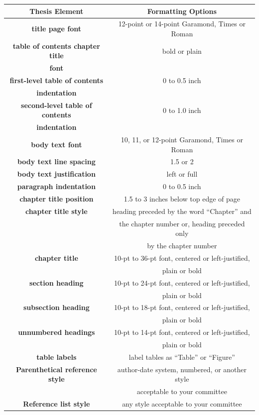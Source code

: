 \begin{table}[h]
	\begin{tabular*}{\textwidth}{|c|@{\extracolsep{\fill}}c|}
		\hline
		\textbf{Thesis Element} & \textbf{Formatting Options} \\ \hline
		\textbf{title page font} & \small 12-point or 14-point Garamond, Times or Roman \\ \hline
		\textbf{table of contents chapter title} & \small bold or plain \\
			\textbf{font} & \\ \hline
		\textbf{first-level table of contents} & \small 0 to 0.5 inch \\
			\textbf{indentation} & \\ \hline
		\textbf{second-level table of contents} & \small 0 to 1.0 inch \\
			\textbf{indentation} & \\ \hline
		\textbf{body text font} & \small 10, 11, or 12-point Garamond, Times or Roman \\ \hline
		\textbf{body text line spacing} & \small 1.5 or 2 \\ \hline
		\textbf{body text justification} & \small left or full \\ \hline
		\textbf{paragraph indentation} & \small 0 to 0.5 inch \\ \hline
		\textbf{chapter title position} & \small 1.5 to 3 inches below top edge of page \\ \hline
		\textbf{chapter title style} & \small heading preceded by the word ``Chapter'' and \\
			& \small the chapter number or, heading preceded only \\
			& \small by the chapter number \\ \hline
		\textbf{chapter title} & \small 10-pt to 36-pt font, centered or left-justified, \\
			& \small plain or bold \\ \hline
		\textbf{section heading} & \small 10-pt to 24-pt font, centered or left-justified, \\
			& \small plain or bold \\ \hline
		\textbf{subsection heading} & \small 10-pt to 18-pt font, centered or left-justified, \\
			& \small plain or bold \\ \hline
		\textbf{unnumbered headings} & \small 10-pt to 14-pt font, centered or left-justified, \\
			& \small plain or bold \\ \hline
		\textbf{table labels} & \small label tables as ``Table'' or ``Figure'' \\ \hline
		\textbf{Parenthetical reference style} & \small author-date system, numbered, or another style \\
			& \small acceptable to your committee \\ \hline
		\textbf{Reference list style} & any style acceptable to your committee \\ \hline
	\end{tabular*}
\end{table}

\fi

